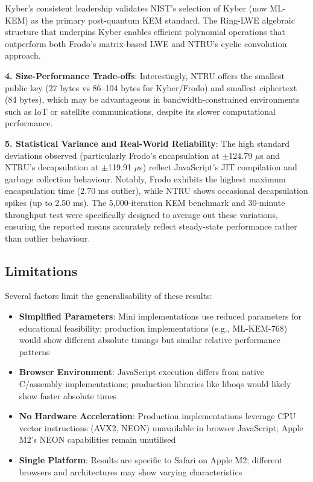 \documentclass[11pt,a4paper]{article}
\begin{document}
Kyber's consistent leadership validates NIST's selection of Kyber (now ML-KEM) as the primary post-quantum KEM standard. The Ring-LWE algebraic structure that underpins Kyber enables efficient polynomial operations that outperform both Frodo's matrix-based LWE and NTRU's cyclic convolution approach.

\textbf{4. Size-Performance Trade-offs}: Interestingly, NTRU offers the smallest public key (27 bytes vs 86--104 bytes for Kyber/Frodo) and smallest ciphertext (84 bytes), which may be advantageous in bandwidth-constrained environments such as IoT or satellite communications, despite its slower computational performance.

\textbf{5. Statistical Variance and Real-World Reliability}: The high standard deviations observed (particularly Frodo's encapsulation at $\pm$124.79 $\mu$s and NTRU's decapsulation at $\pm$119.91 $\mu$s) reflect JavaScript's JIT compilation and garbage collection behaviour. Notably, Frodo exhibits the highest maximum encapsulation time (2.70 ms outlier), while NTRU shows occasional decapsulation spikes (up to 2.50 ms). The 5,000-iteration KEM benchmark and 30-minute throughput test were specifically designed to average out these variations, ensuring the reported means accurately reflect steady-state performance rather than outlier behaviour.

\subsection{Limitations}

Several factors limit the generalisability of these results:

\begin{itemize}
    \item \textbf{Simplified Parameters}: Mini implementations use reduced parameters for educational feasibility; production implementations (e.g., ML-KEM-768) would show different absolute timings but similar relative performance patterns
    \item \textbf{Browser Environment}: JavaScript execution differs from native C/assembly implementations; production libraries like liboqs would likely show faster absolute times
    \item \textbf{No Hardware Acceleration}: Production implementations leverage CPU vector instructions (AVX2, NEON) unavailable in browser JavaScript; Apple M2's NEON capabilities remain unutilised
    \item \textbf{Single Platform}: Results are specific to Safari on Apple M2; different browsers and architectures may show varying characteristics
\end{itemize}
\end{document}

